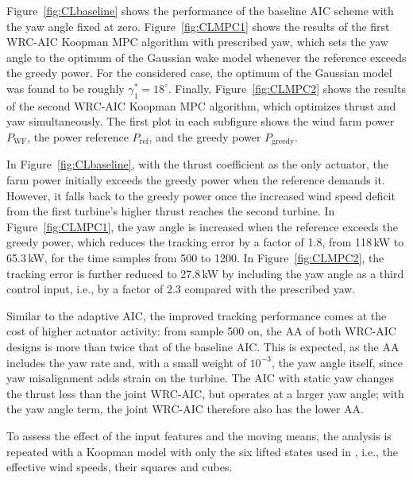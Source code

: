 Figure~\ref{fig:CLbaseline} shows the performance of the baseline AIC scheme with the yaw angle fixed at zero. Figure~\ref{fig:CLMPC1} shows the results of the first WRC-AIC Koopman MPC algorithm with prescribed yaw, which sets the yaw angle to the optimum of the Gaussian wake model whenever the reference exceeds the greedy power. For the considered case, the optimum of the Gaussian model was found to be roughly $\gamma_1^* = 18^\circ$. Finally, Figure~\ref{fig:CLMPC2} shows the results of the second WRC-AIC Koopman MPC algorithm, which optimizes thrust and yaw simultaneously. The first plot in each subfigure shows the wind farm power $P_{\text{WF}}$, the power reference $P_{\text{ref}}$, and the greedy power $P_{\text{greedy}}$.

In Figure~\ref{fig:CLbaseline}, with the thrust coefficient as the only actuator, the farm power initially exceeds the greedy power when the reference demands it. However, it falls back to the greedy power once the increased wind speed deficit from the first turbine's higher thrust reaches the second turbine. In Figure~\ref{fig:CLMPC1}, the yaw angle is increased when the reference exceeds the greedy power, which reduces the tracking error by a factor of 1.8, from 118\,kW to 65.3\,kW, for the time samples from 500 to 1200. 
In Figure~\ref{fig:CLMPC2}, the tracking error is further reduced to 27.8\,kW by including the yaw angle as a third control input, i.e., by a factor of 2.3 compared with the prescribed yaw.

Similar to the adaptive AIC, the improved tracking performance comes at the cost of higher actuator activity: from sample 500 on, the AA of both WRC-AIC designs is more than twice that of the baseline AIC. This is expected, as the AA includes the yaw rate and, with a small weight of $10^{-3}$, the yaw angle itself, since yaw misalignment adds strain on the turbine. The AIC with static yaw changes the thrust less than the joint WRC-AIC, but operates at a larger yaw angle; with the yaw angle term, the joint WRC-AIC therefore also has the lower AA.

To assess the effect of the input features and the moving means, the analysis is repeated with a Koopman model with only the six lifted states used in \cite{dittmer2023koopman}, i.e., the effective wind speeds, their squares and cubes.


